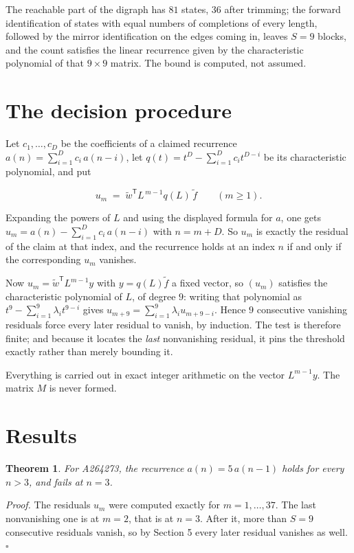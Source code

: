 \documentclass[11pt]{article}
\newtheorem{theorem}{Theorem}
\theoremstyle{definition}
\begin{document}
The reachable part of the digraph has $81$ states, $36$ after trimming; the forward identification of states with equal numbers of completions of every length, followed by the mirror identification on the edges coming in, leaves $S = 9$ blocks, and the count satisfies the linear recurrence given by the characteristic polynomial of that $9\times9$ matrix. The bound is computed, not assumed.

\section{The decision procedure}

Let $c_1,\dots,c_D$ be the coefficients of a claimed recurrence $a(n) = \sum_{i=1}^{D} c_i\,a(n-i)$, let $q(t) = t^{D} - \sum_{i=1}^{D} c_i t^{D-i}$ be its characteristic polynomial, and put

\[u_m \;=\; \tilde w^{\mathsf T} L^{\,m-1} q(L)\,\tilde f \qquad (m \ge 1).\]

Expanding the powers of $L$ and using the displayed formula for $a$, one gets $u_m = a(n) - \sum_{i=1}^{D} c_i\,a(n-i)$ with $n = m + D$. So $u_m$ is exactly the residual of the claim at that index, and the recurrence holds at an index $n$ if and only if the corresponding $u_m$ vanishes.

Now $u_m = \tilde w^{\mathsf T} L^{m-1} y$ with $y = q(L)\tilde f$ a fixed vector, so $(u_m)$ satisfies the characteristic polynomial of $L$, of degree $9$: writing that polynomial as $t^{9} - \sum_{i=1}^{9} \lambda_i t^{9-i}$ gives $u_{m+9} = \sum_{i=1}^{9} \lambda_i u_{m+9-i}$. Hence $9$ consecutive vanishing residuals force every later residual to vanish, by induction. The test is therefore finite; and because it locates the {\itshape last} nonvanishing residual, it pins the threshold exactly rather than merely bounding it.

Everything is carried out in exact integer arithmetic on the vector $L^{m-1}y$. The matrix $M$ is never formed.

\section{Results}

\begin{theorem} For A264273, the recurrence $a(n) = 5\,a(n-1)$ holds for every $n > 3$, and fails at $n = 3$.\end{theorem}

{\itshape Proof.} The residuals $u_m$ were computed exactly for $m = 1,\dots,37$. The last nonvanishing one is at $m = 2$, that is at $n = 3$. After it, more than $S = 9$ consecutive residuals vanish, so by Section 5 every later residual vanishes as well. $\square$
\end{document}
